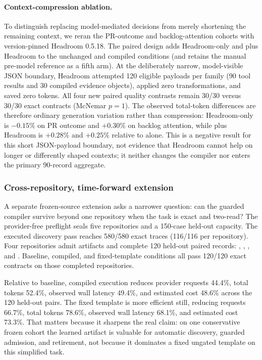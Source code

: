 \paragraph{Context-compression ablation.}
To distinguish replacing model-mediated decisions from merely shortening the remaining
context, we reran the PR-outcome and backlog-attention cohorts with version-pinned
Headroom 0.5.18.  The paired design adds Headroom-only and \method plus Headroom to the
unchanged and compiled conditions (and retains the manual pre-model reference as a fifth
arm).  At the deliberately narrow, model-visible JSON boundary, Headroom attempted 120
eligible payloads per family (90 tool results and 30 compiled evidence objects), applied
zero transformations, and saved zero tokens.  All four new paired quality contrasts remain
30/30 versus 30/30 exact contracts (McNemar $p=1$).  The observed total-token differences
are therefore ordinary generation variation rather than compression: Headroom-only is
$-0.15\%$ on PR outcome and $+0.30\%$ on backlog attention, while \method plus Headroom is
$+0.28\%$ and $+0.25\%$ relative to \method alone.  This is a negative result for this
short JSON-payload boundary, not evidence that Headroom cannot help on longer or differently
shaped contexts; it neither changes the compiler nor enters the primary 90-record aggregate.

\subsubsection{Cross-repository, time-forward extension}
\label{sec:multirepo-results}

A separate frozen-source extension asks a narrower question: can the guarded compiler
survive beyond one repository when the task is exact and two-read?  The provider-free
preflight seals five repositories and a 150-case held-out capacity.  The executed
discovery pass reaches 580/580 exact traces (116/116 per repository).  Four repositories
admit artifacts and complete 120 held-out paired records:
, , , and
.  Baseline, compiled, and fixed-template conditions all pass
120/120 exact contracts on those completed repositories.

Relative to baseline, compiled execution reduces provider requests 44.4\%, total tokens
52.4\%, observed wall latency 49.4\%, and estimated cost 48.6\% across the 120 held-out
pairs.  The fixed template is more efficient still, reducing requests 66.7\%, total
tokens 78.6\%, observed wall latency 68.1\%, and estimated cost 73.3\%.  That matters
because it sharpens the real claim: on one conservative frozen cohort the learned
artifact is valuable for automatic discovery, guarded admission, and retirement, not
because it dominates a fixed ungated template on this simplified task.

